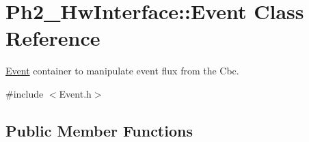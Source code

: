 \hypertarget{class_ph2___hw_interface_1_1_event}{\section{Ph2\-\_\-\-Hw\-Interface\-:\-:Event Class Reference}
\label{class_ph2___hw_interface_1_1_event}
}


\hyperlink{class_ph2___hw_interface_1_1_event}{Event} container to manipulate event flux from the Cbc.  




{\ttfamily \#include $<$Event.\-h$>$}

\subsection*{Public Member Functions}
